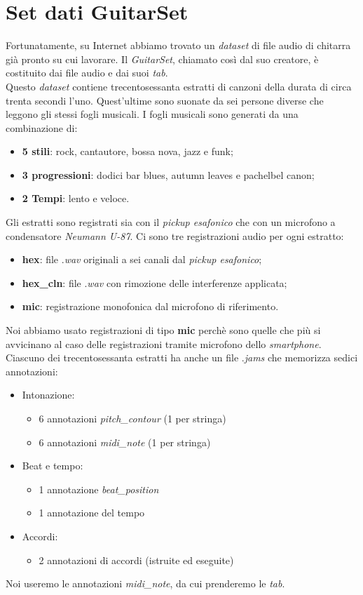 \section{Set dati GuitarSet}
Fortunatamente, su Internet abbiamo trovato un \textit{dataset} di file audio di chitarra già pronto su cui lavorare. Il \textit{GuitarSet}, chiamato così dal suo creatore, è costituito dai file audio e dai suoi \textit{tab}.\\
\newline
Questo \textit{dataset} contiene trecentosessanta estratti di canzoni della durata di circa trenta secondi l'uno. Quest'ultime sono suonate da sei persone diverse che leggono gli stessi fogli musicali. I fogli musicali sono generati da una combinazione di:
\begin{itemize}
	\item \textbf{5 stili}: rock, cantautore, bossa nova, jazz e funk;
	\item \textbf{3 progressioni}: dodici bar blues, autumn leaves e pachelbel canon;
	\item \textbf{2 Tempi}: lento e veloce.
\end{itemize}
Gli estratti sono registrati sia con il \textit{pickup esafonico} che con un microfono a condensatore \textit{Neumann U-87}.
Ci sono tre registrazioni audio per ogni estratto:
\begin{itemize}
	\item \textbf{hex}: file .\textit{wav} originali a sei canali dal \textit{pickup esafonico};
	\item \textbf{hex\_cln}: file .\textit{wav} con rimozione delle interferenze applicata;
	\item \textbf{mic}: registrazione monofonica dal microfono di riferimento.
\end{itemize}
Noi abbiamo usato registrazioni di tipo \textbf{mic} perchè sono quelle che più si avvicinano al caso delle registrazioni tramite microfono dello \textit{smartphone}.\\
\newline
Ciascuno dei trecentosessanta estratti ha anche un file .\textit{jams} che memorizza sedici annotazioni:
\begin{itemize}
	\item Intonazione:
	\begin{itemize}
		\item 6 annotazioni \textit{pitch\_contour} (1 per stringa)
		\item 6 annotazioni \textit{midi\_note} (1 per stringa)
	\end{itemize}
	\item Beat e tempo:
	\begin{itemize}
		\item 1 annotazione \textit{beat\_position}
		\item 1 annotazione del tempo
	\end{itemize}
	\item Accordi:
	\begin{itemize}
		\item 2 annotazioni di accordi (istruite ed eseguite)
	\end{itemize}
\end{itemize}
Noi useremo le annotazioni \textit{midi\_note}, da cui prenderemo le \textit{tab}.
